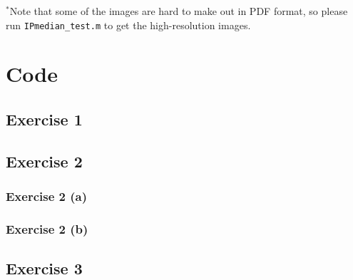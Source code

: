 \documentclass{article}
\begin{document}
$^*$Note that some of the images are hard to make out in PDF format, so please run \texttt{IPmedian\_test.m} to get the high-resolution images.

\newpage

\typeout{}


\appendix
\section{Code}
\subsection{Exercise 1}

\subsection{Exercise 2}
\subsubsection{Exercise 2 (a)}


\subsubsection{Exercise 2 (b)}

\subsection{Exercise 3}

\end{document}
